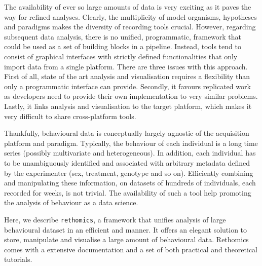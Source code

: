 \documentclass{bioinfo}
\begin{document}
The availability of ever so large amounts of data is very exciting as it paves the way for refined analyses.
Clearly, the multiplicity of model organisms, hypotheses and paradigms makes the diversity of recording tools crucial.
However, regarding subsequent data analysis, there is no unified, programmatic, framework that could be used as a set of building blocks in a pipeline.
Instead, tools tend to consist of graphical interfaces with strictly defined functionalities that only import data from a single platform.
There are three issues with this approach.
First of all, state of the art analysis and visualisation requires a flexibility than only a programmatic interface can provide.
Secondly, it favours replicated work as developers need to provide their own implementation to very similar problems.
Lastly, it links analysis and visualisation to the target platform, which makes it very difficult to share cross-platform tools.
 
Thankfully, behavioural data is conceptually largely agnostic of the acquisition platform and paradigm. 	
Typically, the behaviour of each individual is a long time series (possibly multivariate and heterogeneous).
In addition, each individual has to be unambiguously identified and associated with arbitrary metadata defined by the experimenter (sex, treatment, genotype and so on). Efficiently combining and manipulating these information, on datasets of hundreds of individuals, each recorded for weeks, is not trivial. The availability of such a tool help promoting the analysis of behaviour as a data science.

Here, we describe \texttt{rethomics}, a framework that unifies analysis of large behavioural dataset in an efficient and manner.
It offers an elegant solution to store, manipulate and visualise a large amount of behavioural data.
Rethomics comes with a extensive documentation and a set of both practical and theoretical tutorials.



\end{document}
